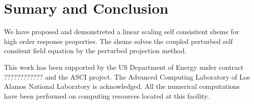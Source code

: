 \documentclass[twocolumn,showpacs,preprintnumbers,amsmath,amssymb]{revtex4}
\begin{document}
\section{Sumary and Conclusion}


 We have proposed and demonstreted a linear scaling self
 consisitent sheme for high order response peoperties.
 The sheme solves the coupled perturbed self consitent field 
 equation by the perturbed projection method.



\begin{acknowledgments}
 This work has been supported by the US Department of Energy 
 under contract ???????????? and the ASCI project.  
 The Advanced Computing Laboratory of Los 
 Alamos National Laboratory is acknowledged.
 All the numerical computations have been
 performed on computing resources located at this facility.
\end{acknowledgments}

\end{document}
